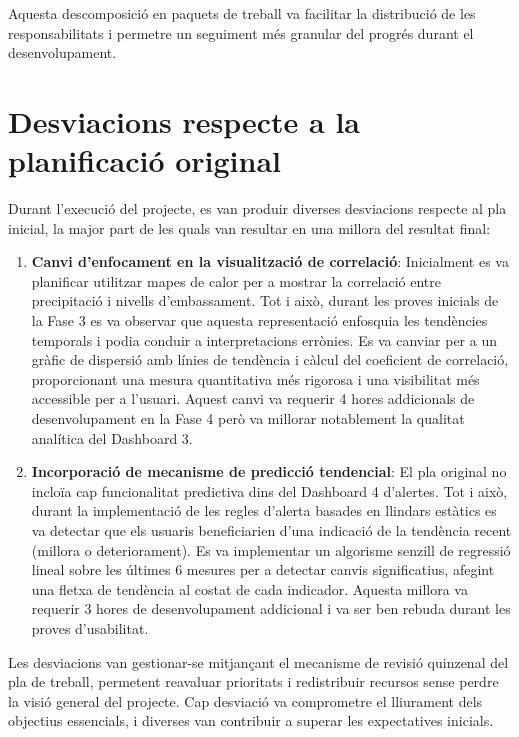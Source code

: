 Aquesta descomposició en paquets de treball va facilitar la distribució de les responsabilitats i permetre un seguiment més granular del progrés durant el desenvolupament.

\section{Desviacions respecte a la planificació original}

Durant l'execució del projecte, es van produir diverses desviacions respecte al pla inicial, la major part de les quals van resultar en una millora del resultat final:

\begin{enumerate}
    \item \textbf{Canvi d'enfocament en la visualització de correlació}: Inicialment es va planificar utilitzar mapes de calor per a mostrar la correlació entre precipitació i nivells d'embassament. Tot i això, durant les proves inicials de la Fase 3 es va observar que aquesta representació enfosquia les tendències temporals i podia conduir a interpretacions errònies. Es va canviar per a un gràfic de dispersió amb línies de tendència i càlcul del coeficient de correlació, proporcionant una mesura quantitativa més rigorosa i una visibilitat més accessible per a l'usuari. Aquest canvi va requerir 4 hores addicionals de desenvolupament en la Fase 4 però va millorar notablement la qualitat analítica del Dashboard 3.
    
    \item \textbf{Incorporació de mecanisme de predicció tendencial}: El pla original no incloïa cap funcionalitat predictiva dins del Dashboard 4 d'alertes. Tot i això, durant la implementació de les regles d'alerta basades en llindars estàtics es va detectar que els usuaris beneficiarien d'una indicació de la tendència recent (millora o deteriorament). Es va implementar un algorisme senzill de regressió lineal sobre les últimes 6 mesures per a detectar canvis significatius, afegint una fletxa de tendència al costat de cada indicador. Aquesta millora va requerir 3 hores de desenvolupament addicional i va ser ben rebuda durant les proves d'usabilitat.
\end{enumerate}

Les desviacions van gestionar-se mitjançant el mecanisme de revisió quinzenal del pla de treball, permetent reavaluar prioritats i redistribuir recursos sense perdre la visió general del projecte. Cap desviació va comprometre el lliurament dels objectius essencials, i diverses van contribuir a superar les expectatives inicials.

